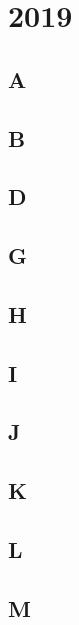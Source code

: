 \section{2019}
\subsection{A}
\raggedbottom
\hrulefill
\subsection{B}
\raggedbottom
\hrulefill
\subsection{D}
\raggedbottom
\hrulefill
\subsection{G}
\raggedbottom
\hrulefill
\subsection{H}
\raggedbottom
\hrulefill
\subsection{I}
\raggedbottom
\hrulefill
\subsection{J}
\raggedbottom
\hrulefill
\subsection{K}
\raggedbottom
\hrulefill
\subsection{L}
\raggedbottom
\hrulefill
\subsection{M}
\raggedbottom
\hrulefill

